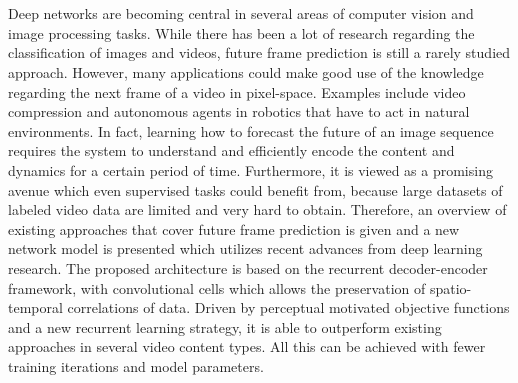 \chapter{\abstractname}

Deep networks are becoming central in several areas of computer vision and image processing tasks. While there has been a lot of research regarding the classification of images and videos, future frame prediction is still a rarely studied approach. However, many applications could make good use of the knowledge regarding the next frame of a video in pixel-space. Examples include video compression and autonomous agents in robotics that have to act in natural environments. In fact, learning how to forecast the future of an image sequence requires the system to understand and efficiently encode the content and dynamics for a certain period of time. Furthermore, it is viewed as a promising avenue which even supervised tasks could benefit from, because large datasets of labeled video data are limited and very hard to obtain. Therefore, an overview of existing approaches that cover future frame prediction is given and a new network model is presented which utilizes recent advances from deep learning research. The proposed architecture is based on the recurrent decoder-encoder framework, with convolutional cells which allows the preservation of spatio-temporal correlations of data. Driven by perceptual motivated objective functions and a new recurrent learning strategy, it is able to outperform existing approaches in several video content types. All this can be achieved with fewer training iterations and model parameters.



